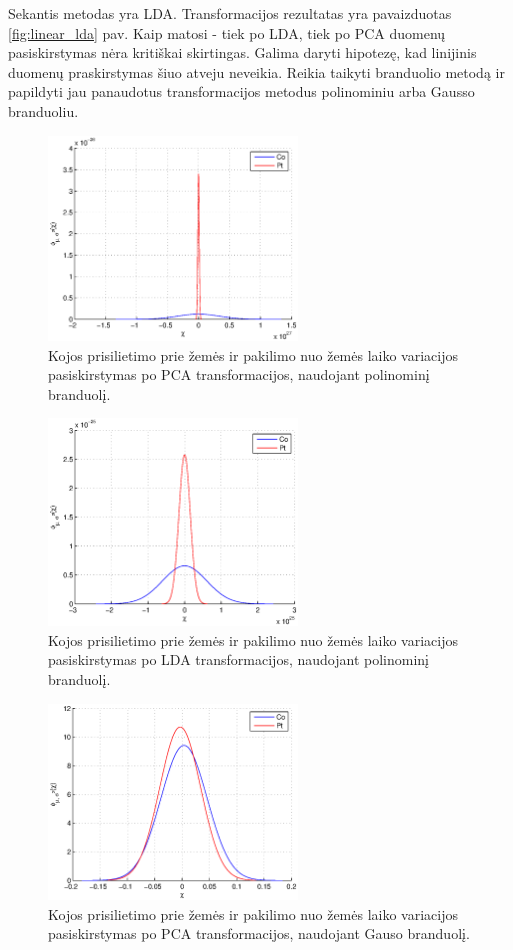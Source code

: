 \documentclass[]{vgtuef}
\begin{document}
Sekantis metodas yra LDA. Transformacijos rezultatas yra pavaizduotas \ref{fig:linear_lda} pav. Kaip matosi - tiek po LDA, tiek po PCA duomenų pasiskirstymas nėra kritiškai skirtingas. Galima daryti hipotezę, kad linijinis duomenų praskirstymas šiuo atveju neveikia. Reikia taikyti branduolio metodą ir papildyti jau panaudotus transformacijos metodus polinominiu arba Gausso branduoliu.

\begin{figure}[!t]
  \centering
  \includegraphics[width=250px]{figures/st_sw_poly_kpca.eps}
  \caption{Kojos prisilietimo prie žemės ir pakilimo nuo žemės laiko
    variacijos pasiskirstymas po PCA transformacijos, naudojant
    polinominį branduolį.}
  \label{fig:poly_pca}
\end{figure}

\begin{figure}[!t]
  \centering
  \includegraphics[width=250px]{figures/st_sw_poly_gda.eps}
  \caption{Kojos prisilietimo prie žemės ir pakilimo nuo žemės laiko
    variacijos pasiskirstymas po LDA transformacijos, naudojant
    polinominį branduolį.}
  \label{fig:poly_lda}
\end{figure}

\begin{figure}[!t]
  \centering
  \includegraphics[width=250px]{figures/st_sw_gauss_kpca.eps}
  \caption{Kojos prisilietimo prie žemės ir pakilimo nuo žemės laiko
    variacijos pasiskirstymas po PCA transformacijos, naudojant Gauso branduolį.}
  \label{fig:gauss_pca}
\end{figure}
\end{document}

